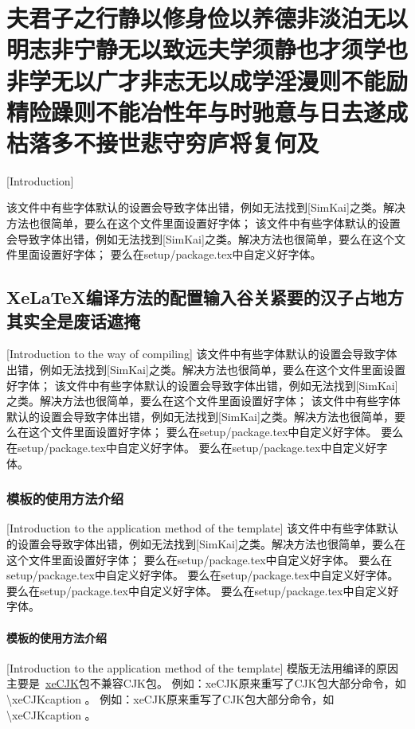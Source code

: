 
\chapter{夫君子之行静以修身俭以养德非淡泊无以明志非宁静无以致远夫学须静也才须学也非学无以广才非志无以成学淫漫则不能励精险躁则不能冶性年与时驰意与日去遂成枯落多不接世悲守穷庐将复何及}[Introduction]

该文件中有些字体默认的设置会导致字体出错，例如无法找到[SimKai]之类。解决方法也很简单，要么在这个文件里面设置好字体；
该文件中有些字体默认的设置会导致字体出错，例如无法找到[SimKai]之类。解决方法也很简单，要么在这个文件里面设置好字体；
要么在setup/package.tex中自定义好字体。
\section{XeLaTeX编译方法的配置输入谷关紧要的汉子占地方其实全是废话遮掩}[Introduction to the \XeLaTeX way of compiling]
该文件中有些字体默认的设置会导致字体出错，例如无法找到[SimKai]之类。解决方法也很简单，要么在这个文件里面设置好字体；
该文件中有些字体默认的设置会导致字体出错，例如无法找到[SimKai]之类。解决方法也很简单，要么在这个文件里面设置好字体；
该文件中有些字体默认的设置会导致字体出错，例如无法找到[SimKai]之类。解决方法也很简单，要么在这个文件里面设置好字体；
要么在setup/package.tex中自定义好字体。
要么在setup/package.tex中自定义好字体。
要么在setup/package.tex中自定义好字体。
\subsection{模板的使用方法介绍}[Introduction to the application method of the template]
该文件中有些字体默认的设置会导致字体出错，例如无法找到[SimKai]之类。解决方法也很简单，要么在这个文件里面设置好字体；
要么在setup/package.tex中自定义好字体。
要么在setup/package.tex中自定义好字体。
要么在setup/package.\cite{kanamori1998shaking}tex中自定义好字体。
要么在setup/package.tex中自定义好字体。
要么在setup/package\cite{chen2016real}.tex中自定义好字体。
\subsubsection{模板的使用方法介绍}[Introduction to the application method of the template]
模版无法用\XeLaTeX 编译的原因主要是~\href{http://bay.uchicago.edu/tex-archive/macros/xetex/latex/xecjk/xeCJK.pdf}{xeCJK}包不兼容CJK包。
例如：xeCJK原来重写了CJK包大部分命令，如\textbackslash xeCJKcaption 。
例如：xeCJK原来重写了CJK包大部分命令，如\textbackslash xeCJKcaption 。

